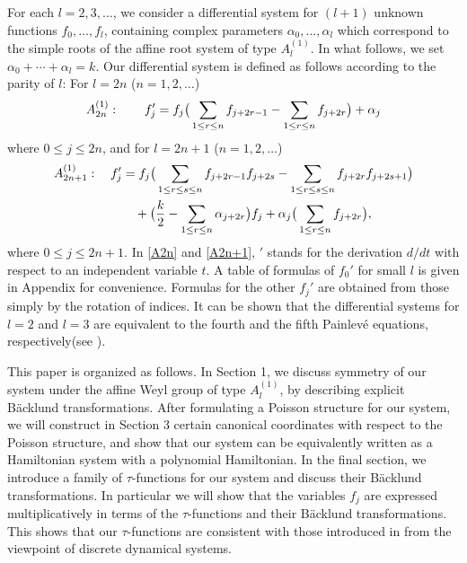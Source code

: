 \medskip
For each $l=2,3,\ldots$, we consider a differential system for 
$(l+1)$ unknown functions $f_0,\ldots,f_l$, containing 
complex parameters $\alpha_0,\ldots,\alpha_l$ 
which correspond to the 
simple roots of the affine root system of type $A^{(1)}_l$.  
In what follows, we set $\alpha_0+\cdots+\alpha_l=k$. 
Our differential system is defined as follows according to the parity of $l$: 
For $l=2n$ ($n=1,2,\ldots$)
\begin{equation}\Label{A2n}
A^{(1)}_{2n}:\qquad f_j'=f_j\big (\sum_{1\le r\le n}f_{j+2r-1}
-\sum_{1\le r\le n} f_{j+2r}\big)+\alpha_j
\end{equation}
where $0\le j \le 2n$, 
and for $l=2n+1$ ($n=1,2,\ldots$)
\begin{equation}\Label{A2n+1}
\begin{align}
A^{(1)}_{2n+1}:\quad f_j'&=f_j\big(
\sum_{ 1\le r\le s\le n } f_{j+2r-1}f_{j+2s}
-\sum_{ 1\le r\le s\le n} f_{j+2r}f_{j+2s+1}
\big)
\\ 
&\quad+\big(\frac{k}{2}-\sum_{1\le r\le n}\alpha_{j+2r}\big)f_j +
\alpha_j\big(\sum_{1\le r\le n}f_{j+2r}\big),\notag
\end{align}
\end{equation}
where $0\le j\le 2n+1$. 
In \eqref{A2n} and \eqref{A2n+1}, 
$'$ stands for the derivation $d/dt$ with respect to 
an independent variable $t$.  
A table of formulas of $f_0'$ for small $l$ is given in Appendix for convenience. 
Formulas for the other $f_j'$ are obtained from those simply by the rotation of indices.
It can be shown that the differential systems for $l=2$ and $l=3$ are equivalent to 
the fourth and the fifth Painlev\'e equations, respectively(see \cite{NY5}).

This paper is organized as follows.  In Section 1, we discuss symmetry of our system 
under the affine Weyl group of type $A^{(1)}_l$, by describing explicit B\"acklund 
transformations.  
After formulating a Poisson structure for our system, we will 
construct in Section 3 
certain canonical coordinates with respect to the Poisson structure, 
and show that our system can be equivalently written as a Hamiltonian 
system with a polynomial Hamiltonian.  
In the final section, we introduce a family of $\tau$-functions for our system 
and discuss their B\"acklund transformations.  In particular 
we will show that the variables $f_j$ are expressed multiplicatively  
in terms of the $\tau$-functions and their B\"acklund transformations. 
This shows that our $\tau$-functions are consistent with those introduced 
in \cite{NY3} from the viewpoint of discrete dynamical systems. 
